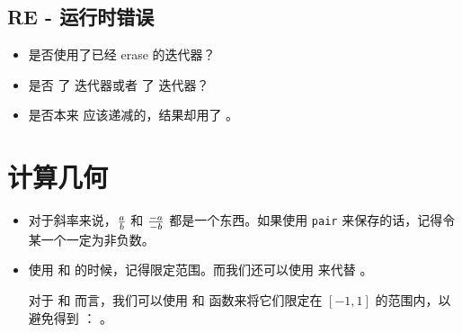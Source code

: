 \subsection{RE - 运行时错误}
\begin{itemize}
    \item 是否使用了已经 erase 的迭代器？
    \item 是否 \cmd{--} 了  迭代器或者 \cmd{++} 了  迭代器？
    \item 是否本来  应该递减的，结果却用了 。
\end{itemize}

\section{计算几何}
\begin{itemize}
    \item 对于斜率来说，$a \over b$ 和 $-a \over -b$ 都是一个东西。如果使用
        \verb|pair| 来保存的话，记得令某一个一定为非负数。
    \item 使用  和  的时候，记得限定范围。而我们还可以使用
         来代替 。

        对于  和  而言，我们可以使用  和 
        函数来将它们限定在 $[-1, 1]$ 的范围内，以避免得到 ：
        。
\end{itemize}
